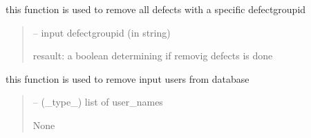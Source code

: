\documentclass[letterpaper,10pt,english]{sphinxmanual}
\begin{document}
\begin{savenotes}
\begin{fulllineitems}

\begin{savenotes}\begin{fulllineitems}
\label{\detokenize{setting/database_utils:oxin.database_utils.dataBaseUtils.remove_defects_by_group_id}}
\pysigstartsignatures
{}
\pysigstopsignatures
\sphinxAtStartPar
this function is used to remove all defects with a specific defect\sphinxhyphen{}group\sphinxhyphen{}id
\begin{quote}\begin{description}
\sphinxAtStartPar
{} – input defect\sphinxhyphen{}group\sphinxhyphen{}id (in string)

\sphinxAtStartPar
resault: a boolean determining if removig defects is done

\end{description}\end{quote}

\end{fulllineitems}\end{savenotes}


\begin{savenotes}\begin{fulllineitems}
\label{\detokenize{setting/database_utils:oxin.database_utils.dataBaseUtils.remove_users}}
\pysigstartsignatures
{}
\pysigstopsignatures
\sphinxAtStartPar
this function is used to remove input users from database
\begin{quote}\begin{description}
\sphinxAtStartPar
{} – (\_type\_) list of user\_names

\sphinxAtStartPar
None

\end{description}\end{quote}


\end{fulllineitems}
\end{savenotes}
\end{fulllineitems}
\end{savenotes}
\end{document}
